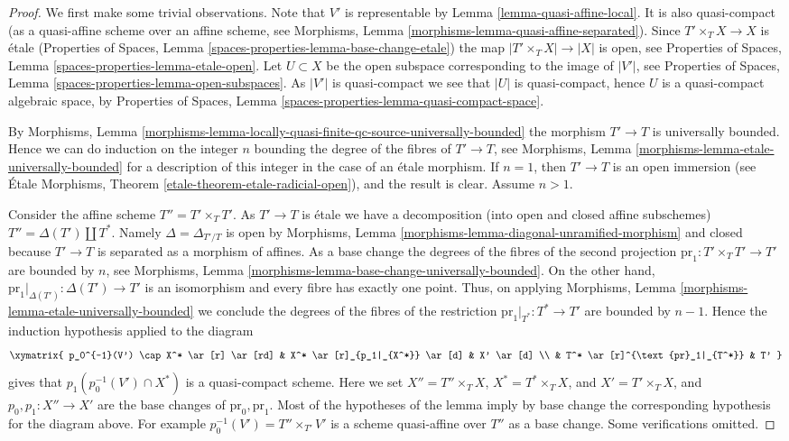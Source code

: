\documentclass{stacks-project}
\theoremstyle{plain}
\theoremstyle{definition}
\theoremstyle{remark}
\numberwithin{equation}{subsection}
\begin{document}
\begin{proof}
We first make some trivial observations.
Note that $V'$ is representable by Lemma \ref{lemma-quasi-affine-local}.
It is also quasi-compact (as a quasi-affine scheme over an affine scheme, see
Morphisms, Lemma \ref{morphisms-lemma-quasi-affine-separated}).
Since $T' \times_T X \to X$ is \'etale
(Properties of Spaces, Lemma \ref{spaces-properties-lemma-base-change-etale})
the map $|T' \times_T X| \to |X|$ is open, see
Properties of Spaces, Lemma \ref{spaces-properties-lemma-etale-open}.
Let $U \subset X$ be the open subspace corresponding to the image of
$|V'|$, see
Properties of Spaces, Lemma \ref{spaces-properties-lemma-open-subspaces}.
As $|V'|$ is quasi-compact we see that $|U|$ is quasi-compact, hence
$U$ is a quasi-compact algebraic space, by
Properties of Spaces, Lemma \ref{spaces-properties-lemma-quasi-compact-space}.

\medskip\noindent
By
Morphisms,
Lemma \ref{morphisms-lemma-locally-quasi-finite-qc-source-universally-bounded}
the morphism $T' \to T$ is universally bounded. Hence we can do induction on
the integer $n$ bounding the degree of the fibres of $T' \to T$, see
Morphisms, Lemma \ref{morphisms-lemma-etale-universally-bounded}
for a description of this integer in the case of an \'etale morphism.
If $n = 1$, then $T' \to T$ is an open immersion (see
\'Etale Morphisms, Theorem \ref{etale-theorem-etale-radicial-open}),
and the result is clear. Assume $n > 1$.

\medskip\noindent
Consider the affine scheme $T'' = T' \times_T T'$.
As $T' \to T$ is \'etale we have a decomposition (into open and closed affine
subschemes) $T'' = \Delta(T') \amalg T^*$. Namely $\Delta = \Delta_{T'/T}$
is open by
Morphisms, Lemma \ref{morphisms-lemma-diagonal-unramified-morphism}
and closed because $T' \to T$ is separated as a morphism of affines.
As a base change the degrees of the fibres of the second projection
$\text{pr}_1 : T' \times_T T' \to T'$ are bounded by $n$, see
Morphisms, Lemma \ref{morphisms-lemma-base-change-universally-bounded}.
On the other hand, $\text{pr}_1|_{\Delta(T')} : \Delta(T') \to T'$ is
an isomorphism and every fibre has exactly one point.
Thus, on applying
Morphisms, Lemma \ref{morphisms-lemma-etale-universally-bounded}
we conclude the degrees of the fibres of the restriction
$\text{pr}_1|_{T^*} : T^* \to T'$ are bounded by $n - 1$.
Hence the induction hypothesis applied to the diagram
$$
\xymatrix{
p_0^{-1}(V') \cap X^* \ar[r] \ar[rd] &
X^* \ar[r]_{p_1|_{X^*}} \ar[d] &
X' \ar[d] \\
& T^* \ar[r]^{\text{pr}_1|_{T^*}} & T'
}
$$
gives that $p_1(p_0^{-1}(V') \cap X^*)$
is a quasi-compact scheme. Here we set
$X'' = T'' \times_T X$, $X^* = T^* \times_T X$, and $X' = T' \times_T X$,
and $p_0, p_1 : X'' \to X'$ are the base changes of $\text{pr}_0, \text{pr}_1$.
Most of the hypotheses of the lemma imply
by base change the corresponding hypothesis for the diagram above.
For example $p_0^{-1}(V') = T'' \times_{T'} V'$
is a scheme quasi-affine over $T''$ as a base change. Some
verifications omitted.


\end{proof}
\end{document}
